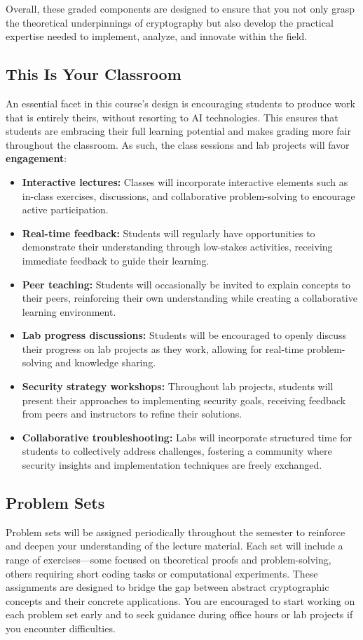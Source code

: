 \documentclass[10pt,a4paper,american]{exam}
\begin{document}
Overall, these graded components are designed to ensure that you not only grasp the theoretical underpinnings of cryptography but also develop the practical expertise needed to implement, analyze, and innovate within the field.

\subsection{This Is Your Classroom}
An essential facet in this course's design is encouraging students to produce work that is entirely theirs, without resorting to AI technologies. This ensures that students are embracing their full learning potential and makes grading more fair throughout the classroom. As such, the class sessions and lab projects will favor \textbf{engagement}:

\begin{itemize}
	\item \textbf{Interactive lectures:} Classes will incorporate interactive elements such as in-class exercises, discussions, and collaborative problem-solving to encourage active participation.
	\item \textbf{Real-time feedback:} Students will regularly have opportunities to demonstrate their understanding through low-stakes activities, receiving immediate feedback to guide their learning.
	\item \textbf{Peer teaching:} Students will occasionally be invited to explain concepts to their peers, reinforcing their own understanding while creating a collaborative learning environment.
	\item \textbf{Lab progress discussions:} Students will be encouraged to openly discuss their progress on lab projects as they work, allowing for real-time problem-solving and knowledge sharing.
	\item \textbf{Security strategy workshops:} Throughout lab projects, students will present their approaches to implementing security goals, receiving feedback from peers and instructors to refine their solutions.
	\item \textbf{Collaborative troubleshooting:} Labs will incorporate structured time for students to collectively address challenges, fostering a community where security insights and implementation techniques are freely exchanged.
\end{itemize}

\subsection{Problem Sets}
Problem sets will be assigned periodically throughout the semester to reinforce and deepen your understanding of the lecture material. Each set will include a range of exercises—some focused on theoretical proofs and problem-solving, others requiring short coding tasks or computational experiments. These assignments are designed to bridge the gap between abstract cryptographic concepts and their concrete applications. You are encouraged to start working on each problem set early and to seek guidance during office hours or lab projects if you encounter difficulties.
\end{document}
